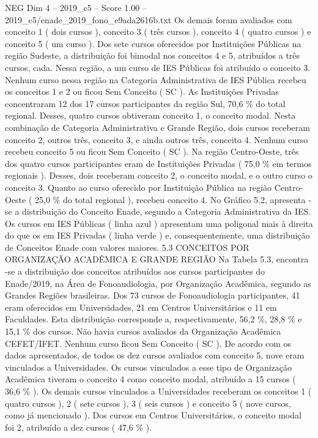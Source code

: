 \begin{textsample}{NEG Dim 4 – 2019\_c5 – Score 1.00 – 2019\_c5/enade\_2019\_fono\_e9ada2616b.txt}
Os demais foram avaliados com conceito 1 ( dois cursos ), conceito 3 ( três cursos ), conceito 4 ( quatro cursos ) e conceito 5 ( um curso ).
Dos sete cursos oferecidos por Instituições Públicas na região Sudeste, a distribuição foi bimodal nos conceitos 4 e 5, atribuídos a três cursos, cada.
Nessa região, a um curso de IES Públicas foi atribuído o conceito 3.
Nenhum curso nessa região na Categoria Administrativa de IES Pública recebeu os conceitos 1 e 2 ou ficou Sem Conceito ( SC ).
As Instituições Privadas concentraram 12 dos 17 cursos participantes da região Sul, 70,6 \% do total regional.
Desses, quatro cursos obtiveram conceito 1, o conceito modal.
Nesta combinação de Categoria Administrativa e Grande Região, dois cursos receberam conceito 2, outros três, conceito 3, e ainda outros três, conceito 4.
Nenhum curso recebeu conceito 5 ou ficou Sem Conceito ( SC ).
Na região Centro-Oeste, três dos quatro cursos participantes eram de Instituições Privadas ( 75,0 \% em termos regionais ).
Desses, dois receberam conceito 2, o conceito modal, e o outro curso o conceito 3.
Quanto ao curso oferecido por Instituição Pública na região Centro-Oeste ( 25,0 \% do total regional ), recebeu conceito 4.
No Gráfico 5.2, apresenta -se a distribuição do Conceito Enade, segundo a Categoria Administrativa da IES.
Os cursos em IES Públicas ( linha azul ) apresentam uma poligonal mais à direita do que os em IES Privadas ( linha verde ) e, consequentemente, uma distribuição de Conceitos Enade com valores maiores. 5.3 CONCEITOS POR ORGANIZAÇÃO ACADÊMICA E GRANDE REGIÃO Na Tabela 5.3, encontra -se a distribuição dos conceitos atribuídos aos cursos participantes do Enade/2019, na Área de Fonoaudiologia, por Organização Acadêmica, segundo as Grandes Regiões brasileiras.
Dos 73 cursos de Fonoaudiologia participantes, 41 eram oferecidos em Universidades, 21 em Centros Universitários e 11 em Faculdades.
Esta distribuição corresponde a, respectivamente, 56,2 \%, 28,8 \% e 15,1 \% dos cursos.
Não havia cursos avaliados da Organização Acadêmica CEFET/IFET.
Nenhum curso ficou Sem Conceito ( SC ).
De acordo com os dados apresentados, de todos os dez cursos avaliados com conceito 5, nove eram vinculados a Universidades.
Os cursos vinculados a esse tipo de Organização Acadêmica tiveram o conceito 4 como conceito modal, atribuído a 15 cursos ( 36,6 \% ).
Os demais cursos vinculados a Universidades receberam os conceitos 1 ( quatro cursos ), 2 ( sete cursos ), 3 ( seis cursos ) e conceito 5 ( nove cursos, como já mencionado ).
Dos cursos em Centros Universitários, o conceito modal foi 2, atribuído a dez cursos ( 47,6 \% ).

\end{textsample}
